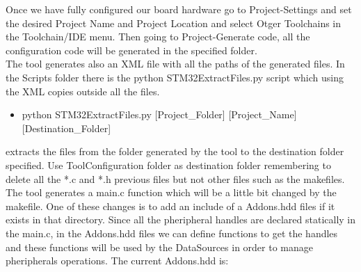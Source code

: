    	Once we have fully configured our board hardware go to Project-Settings and set the desired Project Name and Project Location and select Otger Toolchains in the Toolchain/IDE menu. Then going to Project-Generate code, all the configuration code will be generated in the specified folder.\\
   	The tool generates also an XML file with all the paths of the generated files. In the Scripts folder there is the python STM32ExtractFiles.py script which using the XML copies outside all the files. 
   	\begin{itemize}
   	\item python STM32ExtractFiles.py [Project\_Folder] [Project\_Name] [Destination\_Folder]
   	\end{itemize}
   	extracts the files from the folder generated by the tool to the destination folder specified. Use ToolConfiguration folder as destination folder remembering to delete all the *.c and *.h previous files but not other files such as the makefiles. The tool generates a main.c function which will be a little bit changed by the makefile. One of these changes is to add an include of a Addons.hdd files if it exists in that directory. Since all the pheripheral handles are declared statically in the main.c, in the Addons.hdd files we can define functions to get the handles and these functions will be used by the DataSources in order to manage pheripherals operations. The current Addons.hdd is:

